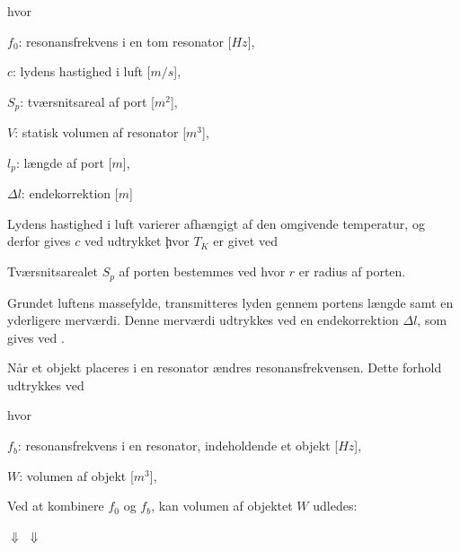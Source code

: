 hvor 
\begin{description}[align=left,labelindent=0.3cm]
\item $f_{0}$: resonansfrekvens i en tom resonator [$Hz$],\\
\item $c$: lydens hastighed i luft [$m/s$],\\
\item $S_{p}$: tværsnitsareal af port [$m^2$],\\
\item $V$: statisk volumen af resonator [$m^3$],\\
\item $l_{p}$: længde af port [$m$],\\
\item $\Delta l$: endekorrektion [$m$]\\
\end{description}

Lydens hastighed i luft varierer afhængigt af den omgivende temperatur, og derfor gives $c$ ved udtrykket \c 

hvor $T_{K}$ er givet ved \T

Tværsnitsarealet $S_{p}$ af porten bestemmes ved \Sp 
hvor ${r}$ er radius af porten. 

Grundet luftens massefylde, transmitteres lyden gennem portens længde samt en yderligere merværdi. Denne merværdi udtrykkes ved en endekorrektion $\Delta l$, som gives ved \deltal. 

Når et objekt placeres i en resonator ændres resonansfrekvensen. Dette forhold udtrykkes ved \fb

hvor 
\begin{description}[align=left,labelindent=0.3cm]
\item $f_{b}$: resonansfrekvens i en resonator, indeholdende et objekt [$Hz$],\\
\item $W$: volumen af objekt [$m^3$],\\
\end{description}

Ved at kombinere $f_{0}$ og $f_{b}$, kan volumen af objektet $W$ udledes: 

\Wudl
$\Downarrow$
\Wudled
$\Downarrow$
\W

